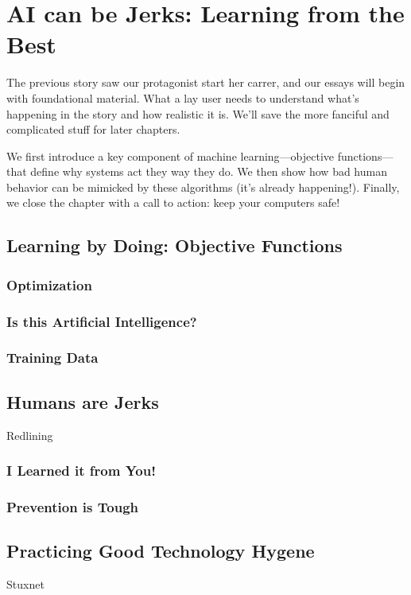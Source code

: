 
\chapter{AI can be Jerks: Learning from the Best}

The previous story saw our protagonist start her carrer, and our essays will begin with foundational material.  What a lay user needs to understand what's happening in the story and how realistic it is.  We'll save the more fanciful and complicated stuff for later chapters.  

We first introduce a key component of machine learning---objective functions---that define why systems act they way they do. We then show how bad human behavior can be mimicked by these algorithms (it's already happening!).  Finally, we close the chapter with a call to action: keep your computers safe!

\section{Learning by Doing: Objective Functions}

\subsection{Optimization}

\subsection{Is this Artificial Intelligence?}

\subsection{Training Data}

\section{Humans are Jerks}

Redlining

\subsection{I Learned it from You!}

\subsection{Prevention is Tough}

\section{Practicing Good Technology Hygene}

Stuxnet